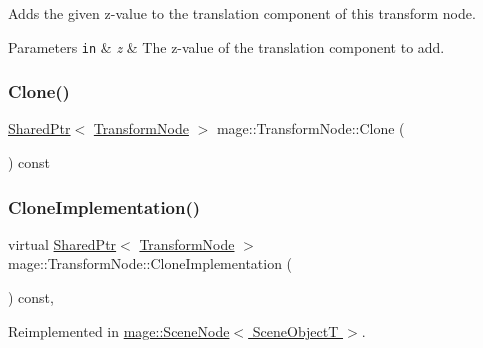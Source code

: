 Adds the given z-\/value to the translation component of this transform node.


\begin{DoxyParams}[1]{Parameters}
\mbox{\tt in}  & {\em z} & The z-\/value of the translation component to add. \\
\hline
\end{DoxyParams}
\hypertarget{classmage_1_1_transform_node_a634282d467c2f56558cc0d3fcafa2d87}{}\label{classmage_1_1_transform_node_a634282d467c2f56558cc0d3fcafa2d87} 
\subsubsection{\texorpdfstring{Clone()}{Clone()}}
{\footnotesize\ttfamily \hyperlink{namespacemage_a1e01ae66713838a7a67d30e44c67703e}{Shared\+Ptr}$<$ \hyperlink{classmage_1_1_transform_node}{Transform\+Node} $>$ mage\+::\+Transform\+Node\+::\+Clone (\begin{DoxyParamCaption}{ }\end{DoxyParamCaption}) const}

\hypertarget{classmage_1_1_transform_node_a5029922f6e9287e4693334ea156057ba}{}\label{classmage_1_1_transform_node_a5029922f6e9287e4693334ea156057ba} 
\subsubsection{\texorpdfstring{Clone\+Implementation()}{CloneImplementation()}}
{\footnotesize\ttfamily virtual \hyperlink{namespacemage_a1e01ae66713838a7a67d30e44c67703e}{Shared\+Ptr}$<$ \hyperlink{classmage_1_1_transform_node}{Transform\+Node} $>$ mage\+::\+Transform\+Node\+::\+Clone\+Implementation (\begin{DoxyParamCaption}{ }\end{DoxyParamCaption}) const\hspace{0.3cm}{\ttfamily [private]}, {\ttfamily [virtual]}}



Reimplemented in \hyperlink{classmage_1_1_scene_node_a51ebb43d49e018665a181c863642a8bc}{mage\+::\+Scene\+Node$<$ Scene\+Object\+T $>$}.

\hypertarget{classmage_1_1_transform_node_ad9c166b58e3718125d2a51827f8d7ca2}{}\label{classmage_1_1_transform_node_ad9c166b58e3718125d2a51827f8d7ca2} 
